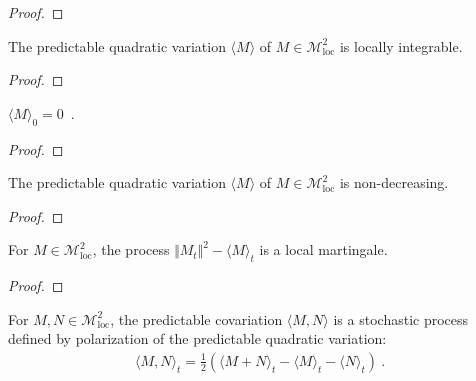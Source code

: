 \begin{proof}\leanok

\end{proof}


\begin{lemma}\label{lem:locallyIntegrable_quadraticVariation}
  \leanok
The predictable quadratic variation $\langle M \rangle$ of $M \in \mathcal{M}^2_{\mathrm{loc}}$ is locally integrable.
\end{lemma}

\begin{proof}\leanok

\end{proof}


\begin{lemma}\label{lem:quadraticVariation_zero}
$\langle M \rangle_0 = 0$~.
\end{lemma}

\begin{proof}

\end{proof}


\begin{lemma}\label{lem:monotone_quadraticVariation}
  \leanok
The predictable quadratic variation $\langle M \rangle$ of $M \in \mathcal{M}^2_{\mathrm{loc}}$ is non-decreasing.
\end{lemma}

\begin{proof}\leanok

\end{proof}


\begin{lemma}\label{lem:local_martingale_sub_quadraticVariation}
For $M \in \mathcal{M}^2_{\mathrm{loc}}$, the process $\Vert M_t \Vert^2 - \langle M \rangle_t$ is a local martingale.
\end{lemma}

\begin{proof}

\end{proof}


\begin{definition}\label{def:covariation}
  \leanok
For $M, N \in \mathcal{M}^2_{\mathrm{loc}}$, the predictable covariation $\langle M, N \rangle$ is a stochastic process defined by polarization of the predictable quadratic variation:
\begin{align*}
  \langle M, N \rangle_t = \frac{1}{2}\left(\langle M+N \rangle_t - \langle M \rangle_t - \langle N \rangle_t \right)
  \: .
\end{align*}
\end{definition}


